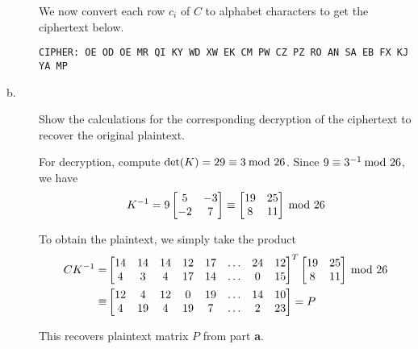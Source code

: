 \documentclass[../hw_sols.tex]{subfiles}
\begin{document}
\begin{description}
\begin{solution}
We now convert each row $c_i$ of $C$ to alphabet characters to get the 
ciphertext below.
\begin{Verbatim}
CIPHER: OE OD OE MR QI KY WD XW EK CM PW CZ PZ RO AN SA EB FX KJ YA MP
\end{Verbatim}

\end{solution}

\item[b.] Show the calculations for the corresponding decryption of the 
ciphertext to recover the original plaintext.

\begin{solution}

For decryption, compute $\det(K) = 29 \equiv 3 \tmod{26}$. Since 
$9 \equiv 3^{-1} \tmod{26}$, we have
	\[ K^{-1} 
	= 9 \begin{bmatrix} 5 & -3 \\ -2 & 7 \end{bmatrix} 
	\equiv \begin{bmatrix} 19 & 25 \\ 8 & 11 \end{bmatrix} \tmod{26} \]

To obtain the plaintext, we simply take the product	
\begin{align*}
	CK^{-1} =& 
	\begin{bmatrix}
		14 & 14 & 14 & 12 & 17 & \dots & 24 & 12 \\
		4 & 3 & 4 & 17 & 14 & \dots & 0 & 15
	\end{bmatrix}^T
	\begin{bmatrix} 19 & 25 \\ 8 & 11 \end{bmatrix} \tmod{26} \\
	\equiv& 
	\begin{bmatrix}
		12 & 4 & 12 & 0 & 19 & \dots & 14 & 10 \\
		4 & 19 & 4 & 19 & 7 & \dots & 2 & 23
	\end{bmatrix}
	= P
\end{align*}

This recovers plaintext matrix $P$ from part \textbf{a}.

\end{solution}

\end{description}


\newpage


\end{document}
